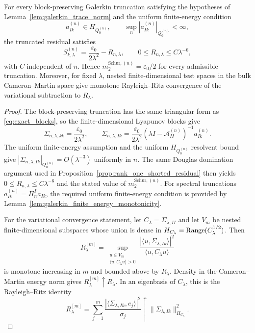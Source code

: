 \begin{lemma}
\label{lem:galerkin_variational_shorting}
For every block-preserving Galerkin truncation satisfying the hypotheses of
Lemma~\ref{lem:galerkin_trace_norm} and the uniform finite-energy condition
\[
  a_{Ik}^{(n)}\in H_{Q_0^{(n)}},
  \qquad
  \sup_n |a_{Ik}^{(n)}|_{Q_0^{(n)}}<\infty,
\]
the truncated residual satisfies
\[
  S_{k,\lambda}^{(n)}
  =
  \frac{\varepsilon_0}{2\lambda^2}-R_{n,\lambda},
  \qquad
  0\le R_{n,\lambda}\le C\lambda^{-6},
\]
with $C$ independent of $n$.  Hence
$m_2^{\mathrm{Schur},(n)}=\varepsilon_0/2$ for every admissible truncation.
Moreover, for fixed $\lambda$, nested finite-dimensional test spaces in the
bulk Cameron--Martin space give monotone Rayleigh--Ritz convergence of the
variational subtraction to $R_\lambda$.
\end{lemma}

\begin{proof}
The block-preserving truncation has the same triangular form as
\eqref{eq:exact_blocks}, so the finite-dimensional Lyapunov blocks give
\[
  \Sigma_{n,\lambda,kk}=\frac{\varepsilon_0}{2\lambda^2},
  \qquad
  \Sigma_{n,\lambda,Ik}
  =
  \frac{\varepsilon_0}{2\lambda^2}
  (\lambda I-\mathcal{A}_{II}^{(n)})^{-1}a_{Ik}^{(n)}.
\]
The uniform finite-energy assumption and the uniform $H_{Q_0^{(n)}}$ resolvent
bound give
$|\Sigma_{n,\lambda,Ik}|_{Q_0^{(n)}}=O(\lambda^{-3})$ uniformly in $n$.
The same Douglas domination argument used in
Proposition~\ref{prop:rank_one_shorted_residual} then yields
$0\le R_{n,\lambda}\le C\lambda^{-6}$ and the stated value of
$m_2^{\mathrm{Schur},(n)}$.  For spectral truncations
$a_{Ik}^{(n)}=\Pi_n^I a_{Ik}$, the required uniform finite-energy condition is
provided by Lemma~\ref{lem:galerkin_finite_energy_monotonicity}.

For the variational convergence statement, let
$C_\lambda=\Sigma_{\lambda,II}$ and let $V_m$ be nested finite-dimensional
subspaces whose union is dense in $H_{C_\lambda}=\operatorname{Range}(C_\lambda^{1/2})$.
Then
\[
  R_\lambda^{[m]}
  =
  \sup_{\substack{u\in V_m\\ \langle u,C_\lambda u\rangle>0}}
  \frac{|\langle u,\Sigma_{\lambda,Ik}\rangle|^2}
       {\langle u,C_\lambda u\rangle}
\]
is monotone increasing in $m$ and bounded above by $R_\lambda$.  Density in the
Cameron--Martin energy norm gives $R_\lambda^{[m]}\uparrow R_\lambda$.  In an
eigenbasis of $C_\lambda$, this is the Rayleigh--Ritz identity
\[
  R_\lambda^{[m]}
  =
  \sum_{j=1}^m
  \frac{|\langle\Sigma_{\lambda,Ik},e_j\rangle|^2}{\sigma_j}
  \uparrow
  \|\Sigma_{\lambda,Ik}\|_{H_{C_\lambda}}^2.
\]
\end{proof}


